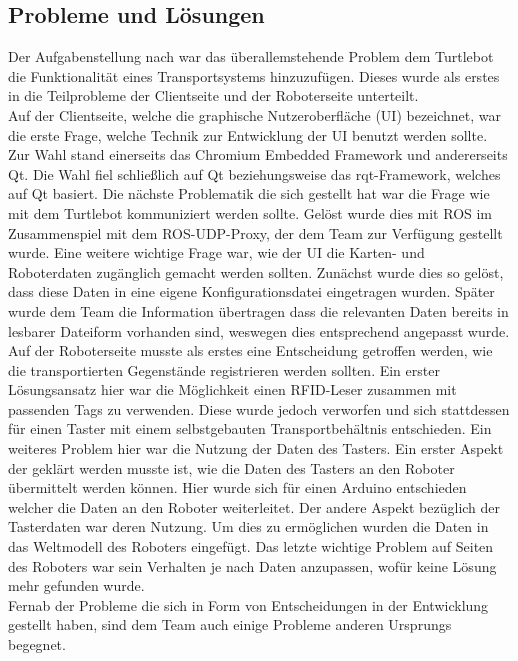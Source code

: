 \documentclass[a4paper,12pt,headsepline]{scrartcl}
\begin{document}
	\subsection{Probleme und Lösungen}
Der Aufgabenstellung nach war das überallemstehende Problem dem Turtlebot die Funktionalität eines Transportsystems hinzuzufügen. Dieses wurde als erstes in die Teilprobleme der Clientseite und der Roboterseite unterteilt.\\
Auf der Clientseite, welche die graphische Nutzeroberfläche (UI) bezeichnet, war die erste Frage, welche Technik zur Entwicklung der UI benutzt werden sollte. Zur Wahl stand einerseits das Chromium Embedded Framework und andererseits Qt. Die Wahl fiel schließlich auf Qt beziehungsweise das rqt-Framework, welches auf Qt basiert. Die nächste Problematik die sich gestellt hat war die Frage wie mit dem Turtlebot kommuniziert werden sollte. Gelöst wurde dies mit ROS im Zusammenspiel mit dem ROS-UDP-Proxy, der dem Team zur Verfügung gestellt wurde. Eine weitere wichtige Frage war, wie der UI die Karten- und Roboterdaten zugänglich gemacht werden sollten. Zunächst wurde dies so gelöst, dass diese Daten in eine eigene Konfigurationsdatei eingetragen wurden. Später wurde dem Team die Information übertragen dass die relevanten Daten bereits in lesbarer Dateiform vorhanden sind, weswegen dies entsprechend angepasst wurde.\\
Auf der Roboterseite musste als erstes eine Entscheidung getroffen werden, wie die transportierten Gegenstände registrieren werden sollten. Ein erster Lösungsansatz hier war die Möglichkeit einen RFID-Leser zusammen mit passenden Tags zu verwenden. Diese wurde jedoch verworfen und sich stattdessen für einen Taster mit einem selbstgebauten Transportbehältnis entschieden. Ein weiteres Problem hier war die Nutzung der Daten des Tasters. Ein erster Aspekt der geklärt werden musste ist, wie die Daten des Tasters an den Roboter übermittelt werden können. Hier wurde sich für einen Arduino entschieden welcher die Daten an den Roboter weiterleitet. Der andere Aspekt bezüglich der Tasterdaten war deren Nutzung. Um dies zu ermöglichen wurden die Daten in das Weltmodell des Roboters eingefügt. Das letzte wichtige Problem auf Seiten des Roboters war sein Verhalten je nach Daten anzupassen, wofür keine Lösung mehr gefunden wurde.\\
Fernab der Probleme die sich in Form von Entscheidungen in der Entwicklung gestellt haben, sind dem Team auch einige Probleme anderen Ursprungs begegnet.\\
\end{document}
